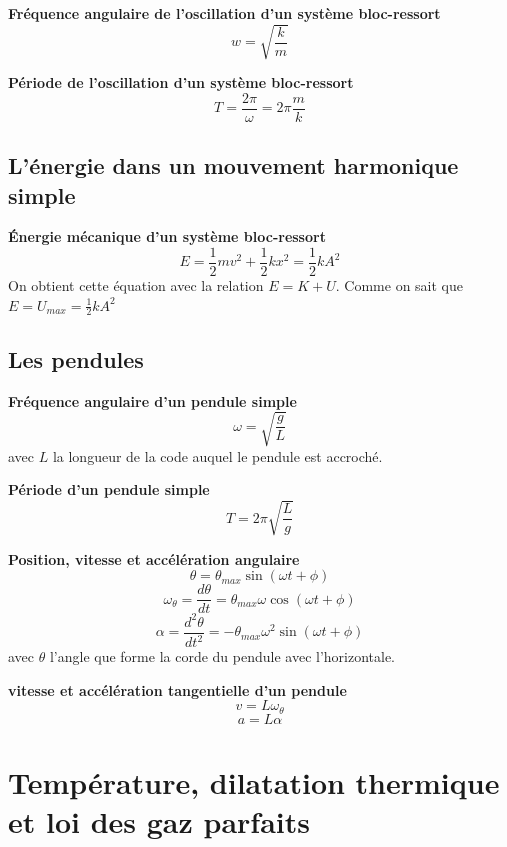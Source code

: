 \documentclass{article}
\begin{document}
\noindent
\textbf{Fréquence angulaire de l'oscillation d'un système bloc-ressort}
\[w = \sqrt{\frac{k}{m}}\]
\newline

\noindent
\textbf{Période de l'oscillation d'un système bloc-ressort}
\[T = \frac{2\pi}{\omega} = 2\pi\frac{m}{k}\]

\subsection{L'énergie dans un mouvement harmonique simple}
\textbf{Énergie mécanique d'un système bloc-ressort}
\[E = \frac{1}{2}mv^2 + \frac{1}{2}kx^2 = \frac{1}{2}kA^2\]
On obtient cette équation avec la relation $E = K + U$. Comme on sait que $E = U_{max} = \frac{1}{2}kA^2$


\subsection{Les pendules}
\noindent
\textbf{Fréquence angulaire d'un pendule simple}
\[\omega = \sqrt{\frac{g}{L}}\]
avec $L$ la longueur de la code auquel le pendule est accroché.
\newline

\noindent
\textbf{Période d'un pendule simple}
\[T = 2\pi\sqrt{\frac{L}{g}}\]
\newline

\noindent
\textbf{Position, vitesse et accélération angulaire}
\[\theta = \theta_{max}\sin{(\omega t + \phi)}\]
\[\omega_{\theta} = \frac{d\theta}{dt} = \theta_{max}\omega\cos{(\omega t + \phi)}\]
\[\alpha = \frac{d^2\theta}{dt^2} = -\theta_{max}\omega^2\sin{(\omega t + \phi)}\]
avec $\theta$ l'angle que forme la corde du pendule avec l'horizontale.
\newline

\noindent
\textbf{vitesse et accélération tangentielle d'un pendule}
\[v = L\omega_{\theta}\]
\[a = L\alpha\]


\section{Température, dilatation thermique et loi des gaz parfaits}
\end{document}
